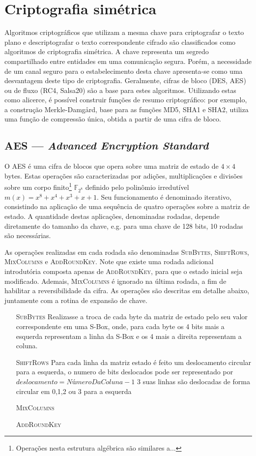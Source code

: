 \documentclass{article}
\begin{document}
\section{Criptografia simétrica}

Algoritmos criptográficos que utilizam a mesma chave para criptografar o
texto plano e descriptografar o texto correspondente cifrado são classificados
como algoritmos de criptografia simétrica. A chave representa um segredo
compartilhado entre entidades em uma comunicação segura. Porém, a necessidade
de um canal seguro para o estabelecimento desta chave apresenta-se como uma
desvantagem deste tipo de criptografia. Geralmente, cifras de bloco (DES, AES)
ou de fluxo (RC4, Salsa20) são a base para estes algoritmos. Utilizando estas
como alicerce, é possível construir funções de resumo criptográfico: por
exemplo, a construção Merkle-Damgård, base para as funções MD5, SHA1 e SHA2,
utiliza uma função de compressão única, obtida a partir de uma cifra de bloco.

\subsection{AES --- \emph{Advanced Encryption Standard}}

O AES é uma cifra de blocos que opera sobre uma matriz de estado de $4 \times 4$ bytes. Estas operações são caracterizadas por adições, multiplicações e divisões sobre um corpo finito\footnote{Operações nesta estrutura algébrica são similares a...}
$\mathbb{F}_{2^{8}}$ definido pelo polinômio irredutível $m(x) = x^{8} + x^{4} + x^{3} + x + 1$. Seu funcionamento é denominado
iterativo, consistindo na aplicação de uma sequência de quatro operações sobre a matriz de estado. A quantidade destas aplicações, denominadas rodadas, depende diretamente do tamanho da chave, e.g. para uma chave de 128 bits, 10 rodadas são necessárias.

As operações realizadas em cada rodada são denominadas \textsc{SubBytes}, \textsc{ShiftRows}, \textsc{MixColumns} e \textsc{AddRoundKey}. Note que existe uma rodada adicional introdutória
composta apenas de \textsc{AddRoundKey}, para que o estado inicial seja modificado. Ademais, \textsc{MixColumns} é ignorado na última rodada, a fim de habilitar a reversibilidade da cifra.
As operações são descritas em detalhe abaixo, juntamente com a rotina de expansão de chave.

\begin{enumerate}
    \item[\textsc{SubBytes}] Realizasse a troca de cada byte da matriz de estado pelo seu valor correspondente em uma S-Box, onde, para cada byte os 4 bits mais a esquerda representam a linha da S-Box e os 4 mais a direita representam a coluna.
    \item[\textsc{ShiftRows}] Para cada linha da matriz estado é feito um deslocamento circular para a esquerda, o numero de bits deslocados pode ser representado por $deslocamento = NúmeroDaColuna - 1$ 3 suas linhas são deslocadas de forma circular em 0,1,2 ou 3 para a esquerda
    \item[\textsc{MixColumns}] 
    \item[\textsc{AddRoundKey}] 
\end{enumerate}
\end{document}
